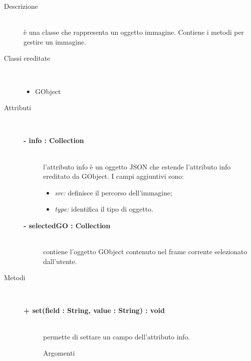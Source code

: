 \begin{description}
\item[Descrizione] \hfill \\
	è una classe che rappresenta un oggetto immagine. Contiene i metodi per gestire un immagine.
	
\item[Classi ereditate] \hfill \\
	\begin{itemize}
		\item GObject
	\end{itemize}
	
\item[Attributi] \hfill \\
	\begin{description}
		\item[\textbf{- info : Collection			}] \hfill \\
			l'attributo info è un oggetto JSON che estende l'attributo info ereditato da GObject. I campi aggiuntivi sono:
	\begin{itemize}
		\item \textit{src:} definisce il percorso dell'immagine;
		\item \textit{type:} identifica il tipo di oggetto.		
	\end{itemize}
	\end{description}
	\begin{description}
		\item[\textbf{- selectedGO : Collection			}] \hfill \\
			contiene l'oggetto GObject contenuto nel frame corrente selezionato dall'utente.  
	\end{description}	
	
\item[Metodi] \hfill \\

		\begin{description}
		\item[\textbf{\color{blue}+ set(field : String, value : String) : void			}] \hfill \\
			permette di settare un campo dell'attributo info.
			
		\begin{description}
			\item[Argomenti] \hfill \\
				\begin{itemize}
				

\end{itemize}
\end{description}
\end{description}
\end{description}
